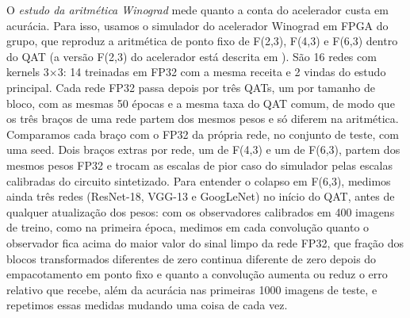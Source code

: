 \documentclass[conference]{IEEEtran}
\newcommand{\by}{\ensuremath{\times}}
\begin{document}
O \textit{estudo da aritmética Winograd} mede quanto a conta do acelerador custa em acurácia. Para isso, usamos o simulador do
acelerador Winograd em FPGA do grupo, que reproduz a aritmética de ponto fixo de F(2,3), F(4,3) e F(6,3) dentro do QAT (a versão F(2,3) do acelerador está descrita em \cite{schmitz2026multicore}). São 16 redes
com kernels 3\by3: 14 treinadas em FP32 com a mesma receita e 2 vindas do estudo principal. Cada rede FP32 passa depois por três QATs,
um por tamanho de bloco, com as mesmas 50 épocas e a mesma taxa do QAT comum, de modo que os três braços de uma rede partem dos mesmos
pesos e só diferem na aritmética. Comparamos cada braço com o FP32 da própria rede, no conjunto de teste, com uma seed. Dois braços extras
por rede, um de F(4,3) e um de F(6,3), partem dos mesmos pesos FP32 e trocam as escalas de pior caso do simulador pelas escalas calibradas do circuito sintetizado.
Para entender o colapso em F(6,3), medimos ainda três redes (ResNet-18, VGG-13 e GoogLeNet) no início do QAT, antes de qualquer atualização dos pesos: com os
observadores calibrados em 400 imagens de treino, como na primeira época, medimos em cada convolução quanto o observador fica acima do maior valor do sinal
limpo da rede FP32, que fração dos blocos transformados diferentes de zero continua diferente de zero depois do empacotamento em ponto fixo e quanto a
convolução aumenta ou reduz o erro relativo que recebe, além da acurácia nas primeiras 1000 imagens de teste, e repetimos essas medidas mudando uma coisa de cada vez.
\end{document}
